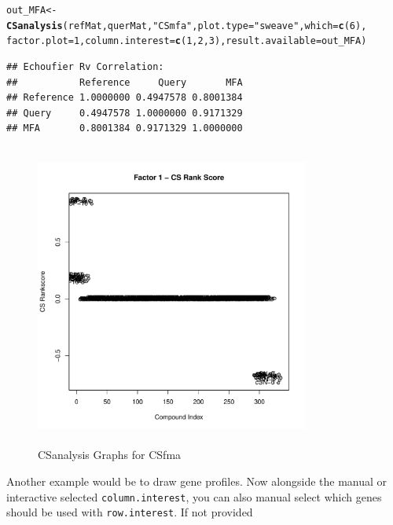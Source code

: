 \documentclass[a4paper]{article}\usepackage[]{graphicx}\usepackage[]{color}
\makeatletter
\newcommand{\hlnum}[1]{\textcolor[rgb]{0.686,0.059,0.569}{#1}}%
\newcommand{\hlstr}[1]{\textcolor[rgb]{0.192,0.494,0.8}{#1}}%
\newcommand{\hlstd}[1]{\textcolor[rgb]{0.345,0.345,0.345}{#1}}%
\newcommand{\hlkwb}[1]{\textcolor[rgb]{0.69,0.353,0.396}{#1}}%
\newcommand{\hlkwc}[1]{\textcolor[rgb]{0.333,0.667,0.333}{#1}}%
\newcommand{\hlkwd}[1]{\textcolor[rgb]{0.737,0.353,0.396}{\textbf{#1}}}%
\newenvironment{kframe}{%
 \def\at@end@of@kframe{}%
 \ifinner\ifhmode%
  \def\at@end@of@kframe{\end{minipage}}%
  \begin{minipage}{\columnwidth}%
 \fi\fi%
 \def\FrameCommand##1{\hskip\@totalleftmargin \hskip-\fboxsep
 \colorbox{shadecolor}{##1}\hskip-\fboxsep
     \hskip-\linewidth \hskip-\@totalleftmargin \hskip\columnwidth}%
 \MakeFramed {\advance\hsize-\width
   \@totalleftmargin\z@ \linewidth\hsize
   \@setminipage}}%
 {\par\unskip\endMakeFramed%
 \at@end@of@kframe}
\newenvironment{knitrout}{}{} %
\makeatother
\begin{document}
\begin{knitrout}
\color{fgcolor}\begin{kframe}
\begin{alltt}
        \hlstd{out_MFA} \hlkwb{<-} \hlkwd{CSanalysis}\hlstd{(refMat,querMat,}\hlstr{"CSmfa"}\hlstd{,}\hlkwc{plot.type}\hlstd{=}\hlstr{"sweave"}\hlstd{,}\hlkwc{which}\hlstd{=}\hlkwd{c}\hlstd{(}\hlnum{6}\hlstd{),}
                        \hlkwc{factor.plot}\hlstd{=}\hlnum{1}\hlstd{,}\hlkwc{column.interest}\hlstd{=}\hlkwd{c}\hlstd{(}\hlnum{1}\hlstd{,}\hlnum{2}\hlstd{,}\hlnum{3}\hlstd{),}\hlkwc{result.available}\hlstd{=out_MFA)}
\end{alltt}
\begin{verbatim}
## Echoufier Rv Correlation:
##           Reference     Query       MFA
## Reference 1.0000000 0.4947578 0.8001384
## Query     0.4947578 1.0000000 0.9171329
## MFA       0.8001384 0.9171329 1.0000000
\end{verbatim}
\end{kframe}\begin{figure}[H]


\includegraphics[width=9cm,height=10cm]{figure/MFA2-1} \hfill{}

\caption[CSanalysis Graphs for CSfma]{CSanalysis Graphs for CSfma\label{fig:MFA2}}
\end{figure}


\end{knitrout}
\noindent Another example would be to draw gene profiles. Now alongside the
manual or interactive selected \texttt{column.interest}, you can also manual
select which genes should be used with \texttt{row.interest}. If not provided
\end{document}
